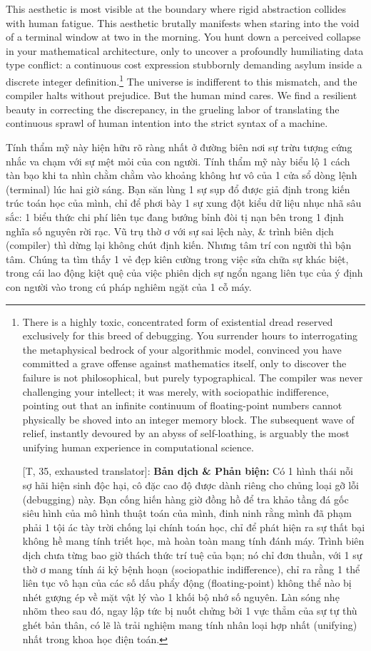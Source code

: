 \documentclass[11pt]{article}
\begin{document}
This aesthetic is most visible at the boundary where rigid abstraction collides with human fatigue. This aesthetic brutally manifests when staring into the void of a terminal window at two in the morning. You hunt down a perceived collapse in your mathematical architecture, only to uncover a profoundly humiliating data type conflict: a continuous cost expression stubbornly demanding asylum inside a discrete integer definition.\footnote{There is a highly toxic, concentrated form of existential dread reserved exclusively for this breed of debugging. You surrender hours to interrogating the metaphysical bedrock of your algorithmic model, convinced you have committed a grave offense against mathematics itself, only to discover the failure is not philosophical, but purely typographical. The compiler was never challenging your intellect; it was merely, with sociopathic indifference, pointing out that an infinite continuum of floating-point numbers cannot physically be shoved into an integer memory block. The subsequent wave of relief, instantly devoured by an abyss of self-loathing, is arguably the most unifying human experience in computational science.
	
	\textsf{[T, 35, exhausted translator]:} \textbf{Bản dịch \& Phản biện:} Có 1 hình thái nỗi sợ hãi hiện sinh độc hại, cô đặc cao độ được dành riêng cho chủng loại gỡ lỗi (debugging) này. Bạn cống hiến hàng giờ đồng hồ để tra khảo tầng đá gốc siêu hình của mô hình thuật toán của mình, đinh ninh rằng mình đã phạm phải 1 tội ác tày trời chống lại chính toán học, chỉ để phát hiện ra sự thất bại không hề mang tính triết học, mà hoàn toàn mang tính đánh máy. Trình biên dịch chưa từng bao giờ thách thức trí tuệ của bạn; nó chỉ đơn thuần, với 1 sự thờ ơ mang tính ái kỷ bệnh hoạn (sociopathic indifference), chỉ ra rằng 1 thể liên tục vô hạn của các số dấu phẩy động (floating-point) không thể nào bị nhét gượng ép về mặt vật lý vào 1 khối bộ nhớ số nguyên. Làn sóng nhẹ nhõm theo sau đó, ngay lập tức bị nuốt chửng bởi 1 vực thẳm của sự tự thù ghét bản thân, có lẽ là trải nghiệm mang tính nhân loại hợp nhất (unifying) nhất trong khoa học điện toán.} The universe is indifferent to this mismatch, and the compiler halts without prejudice. But the human mind cares. We find a resilient beauty in correcting the discrepancy, in the grueling labor of translating the continuous sprawl of human intention into the strict syntax of a machine.

Tính thẩm mỹ này hiện hữu rõ ràng nhất ở đường biên nơi sự trừu tượng cứng nhắc va chạm với sự mệt mỏi của con người. Tính thẩm mỹ này biểu lộ 1 cách tàn bạo khi ta nhìn chằm chằm vào khoảng không hư vô của 1 cửa sổ dòng lệnh (terminal) lúc hai giờ sáng. Bạn săn lùng 1 sự sụp đổ được giả định trong kiến trúc toán học của mình, chỉ để phơi bày 1 sự xung đột kiểu dữ liệu nhục nhã sâu sắc: 1 biểu thức chi phí liên tục đang bướng bỉnh đòi tị nạn bên trong 1 định nghĩa số nguyên rời rạc. Vũ trụ thờ ơ với sự sai lệch này, \& trình biên dịch (compiler) thì dừng lại không chút định kiến. Nhưng tâm trí con người thì bận tâm. Chúng ta tìm thấy 1 vẻ đẹp kiên cường trong việc sửa chữa sự khác biệt, trong cái lao động kiệt quệ của việc phiên dịch sự ngổn ngang liên tục của ý định con người vào trong cú pháp nghiêm ngặt của 1 cỗ máy.
\end{document}
